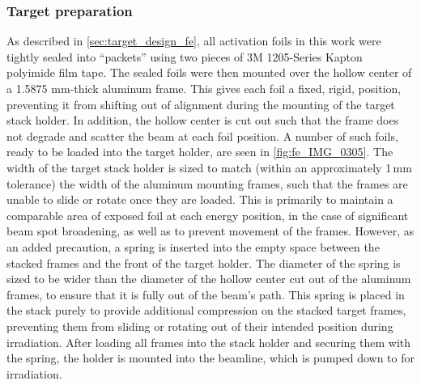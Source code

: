 \subsubsection{Target preparation}

As described in \autoref{sec:target_design_fe}, all activation  foils in this work were   tightly sealed into \enquote{packets} using two pieces of  3M 1205-Series Kapton polyimide film tape.
The sealed foils were then mounted over the hollow center of a 1.5875 mm-thick aluminum frame.
This gives each foil a fixed, rigid, position, preventing it from shifting out of alignment during the mounting of the target stack holder.
In addition, the hollow center is cut out such that the  frame does not degrade and scatter the beam at each foil position.
A number of such foils, ready to be loaded into the target holder, are seen in \autoref{fig:fe_IMG_0305}.
The width of the target stack holder is sized to match (within an approximately 1\,mm tolerance) the width of the aluminum mounting frames, such that the frames are unable to slide or rotate once they are loaded.
This is primarily to maintain a comparable area of exposed foil at each energy position, in the case of significant beam spot broadening, as well as to prevent movement of the frames.
However, as an added precaution, a spring is inserted into the empty space between the stacked frames and the front of the target holder.
The diameter of the spring is sized to be wider than the diameter of the   hollow center  cut out of the aluminum frames, to ensure that it is fully out of the beam's path.
This spring is placed in the stack purely to provide additional compression on the stacked target frames, preventing them from sliding or rotating out of their intended position during irradiation.
After loading all frames into the stack holder and securing them with the spring, the holder is mounted into the beamline, which is pumped down to  for irradiation.
